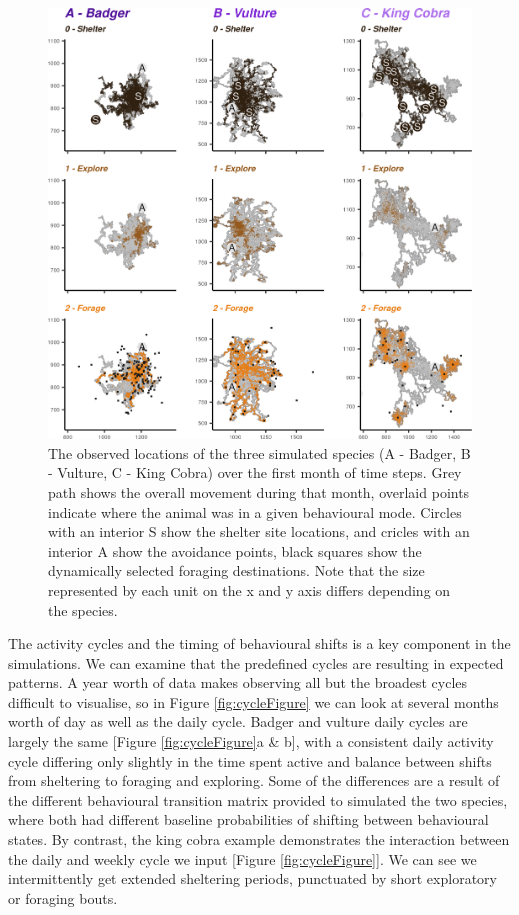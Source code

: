 \documentclass[10pt,a4paper]{article}
\begin{document}
\begin{figure}

{\centering \includegraphics{Agent-based_model_walkthrough_files/figure-latex/oneMonthMapFigure-1} 

}

\caption{The observed locations of the three simulated species (A - Badger, B - Vulture, C - King Cobra) over the first month of time steps. Grey path shows the overall movement during that month, overlaid points indicate where the animal was in a given behavioural mode. Circles with an interior S show the shelter site locations, and cricles with an interior A show the avoidance points, black squares show the dynamically selected foraging destinations. Note that the size represented by each unit on the x and y axis differs depending on the species.}\label{fig:oneMonthMapFigure}
\end{figure}

The activity cycles and the timing of behavioural shifts is a key component in the simulations.
We can examine that the predefined cycles are resulting in expected patterns.
A year worth of data makes observing all but the broadest cycles difficult to visualise, so in Figure \ref{fig:cycleFigure} we can look at several months worth of day as well as the daily cycle.
Badger and vulture daily cycles are largely the same {[}Figure \ref{fig:cycleFigure}a \& b{]}, with a consistent daily activity cycle differing only slightly in the time spent active and balance between shifts from sheltering to foraging and exploring.
Some of the differences are a result of the different behavioural transition matrix provided to simulated the two species, where both had different baseline probabilities of shifting between behavioural states.
By contrast, the king cobra example demonstrates the interaction between the daily and weekly cycle we input {[}Figure \ref{fig:cycleFigure}{]}.
We can see we intermittently get extended sheltering periods, punctuated by short exploratory or foraging bouts.
\end{document}
